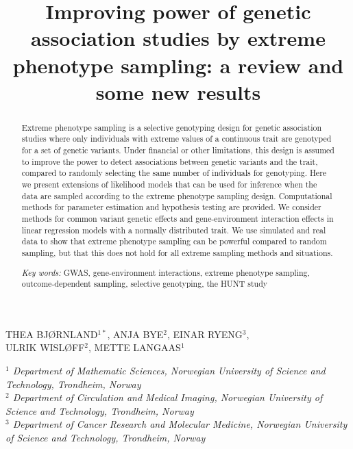 \documentclass[10pt,a4paper]{article}
\begin{document}
\title{Improving power of genetic association studies by extreme phenotype sampling: a review and some new results}
\date{}
\author{}
\maketitle

\begin{center}
THEA BJØRNLAND$^{1 \ast}$, ANJA BYE$^2$, EINAR RYENG$^3$, \\ ULRIK WISLØFF$^2$, METTE LANGAAS$^1$

\vspace{3mm}
\textit{$^1$ Department of Mathematic Sciences,
Norwegian University of Science and Technology, Trondheim,
Norway \\
$^2$ Department of Circulation and Medical Imaging, Norwegian University of Science and Technology, Trondheim, Norway \\
$^3$ Department of Cancer Research and Molecular Medicine, Norwegian University of Science and Technology, Trondheim, Norway}
\end{center}

\begin{abstract}
Extreme phenotype sampling is a selective genotyping design for genetic association studies where only individuals with extreme values of a continuous trait are genotyped for a set of genetic variants. Under financial or other limitations, this design is assumed to improve the power to detect associations between genetic variants and the trait, compared to randomly selecting the same number of individuals for genotyping. Here we present extensions of likelihood models that can be used for inference when the data are sampled according to the extreme phenotype sampling design. Computational methods for parameter estimation and hypothesis testing are provided. We consider methods for common variant genetic effects and gene-environment interaction effects in linear regression models with a normally distributed trait. We use simulated and real data to show that extreme phenotype sampling can be powerful compared to random sampling, but that this does not hold for all extreme sampling methods and situations.

\textit{Key words:} {GWAS, gene-environment interactions, extreme phenotype sampling, outcome-dependent sampling, selective genotyping, the HUNT study}
\end{abstract}
\end{document}
